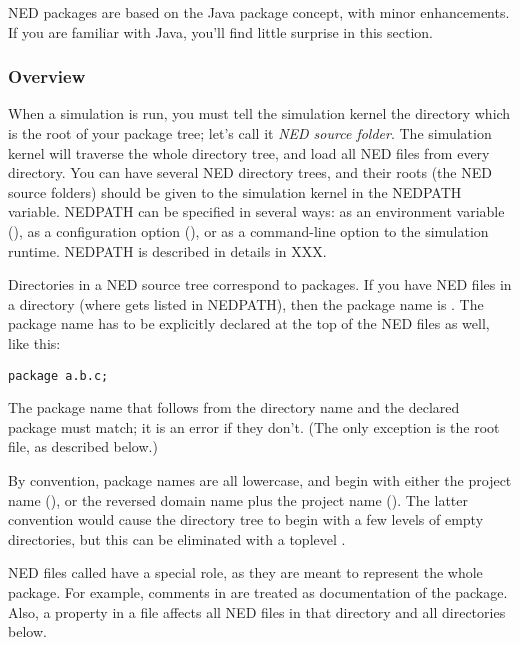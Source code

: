 \begin{note}
    NED packages are based on the Java package concept, with minor
    enhancements. If you are familiar with Java, you'll find little
    surprise in this section.
\end{note}

\subsubsection{Overview}

When a simulation is run, you must tell the simulation kernel the
directory which is the root of your package tree; let's call it
\textit{NED source folder}. The simulation kernel will traverse
the whole directory tree, and load all NED files from every directory.
You can have several NED directory trees, and their roots (the NED source
folders) should be given to the simulation kernel in the NEDPATH
variable. NEDPATH can be specified in several ways: as an environment
variable (), as a configuration option (),
or as a command-line option to the simulation runtime. NEDPATH is
described in details in XXX.

Directories in a NED source tree correspond to packages. If you have
NED files in a  directory (where 
gets listed in NEDPATH), then the package name is .
The package name has to be explicitly declared at the top of the NED
files as well, like this:

\begin{Verbatim}
package a.b.c;
\end{Verbatim}

The package name that follows from the directory name and the declared
package must match; it is an error if they don't. (The only exception
is the root  file, as described below.)

By convention, package names are all lowercase, and begin with either
the project name (), or the reversed domain name plus the
project name (). The latter convention
would cause the directory tree to begin with a few levels of empty
directories, but this can be eliminated with a toplevel .

NED files called  have a special role, as they are meant
to represent the whole package. For example, comments in
 are treated as documentation of the package. Also, a
 property in a  file affects all NED
files in that directory and all directories below.

